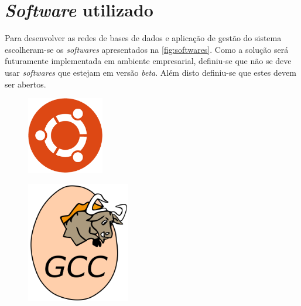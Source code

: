\documentclass[11pt,twoside,a4paper]{report}
\begin{document}

\newpage
\section{\textit{Software} utilizado}
Para desenvolver as redes de bases de dados e aplicação de gestão do sistema escolheram-se os \textit{softwares} apresentados na \autoref{fig:softwares}. Como a solução será futuramente implementada em ambiente empresarial, definiu-se que não se deve usar \textit{softwares} que estejam em versão \textit{beta}. Além disto definiu-se que estes devem ser abertos.
\begin{figure}[H]
	\centering
	\begin{minipage}{0.33\textwidth}
		\vspace{.87cm}
		\begin{center}
			\includegraphics[width=0.3\textwidth]{ubuntu} %
			\label{fig:linux}
		\end{center}
	\end{minipage}%
	\begin{minipage}{0.33\textwidth}
		\begin{center}
			\includegraphics[width=0.4\textwidth]{gcc} %

\end{center}
\end{minipage}
\end{figure}
\end{document}
